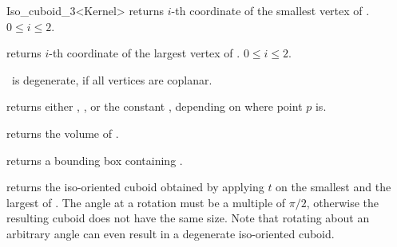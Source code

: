 \begin{ccRefClass} {Iso_cuboid_3<Kernel>}
         {returns $i$-th  coordinate of
          the smallest vertex of \ccVar. 
          \ccPrecond $0 \leq i \leq 2$.}

         {returns $i$-th  coordinate of
          the largest vertex of \ccVar. 
          \ccPrecond $0 \leq i \leq 2$.}

\ccPredicates

       {%
        \ccVar\ is degenerate, if all vertices
        are coplanar.}

       {returns either ,
        , or the constant
        , 
        depending on where point $p$ is.}

       {}
\ccGlue
{}
       {}
\ccGlue
{}
       {}


       {returns the volume of \ccVar. }

       {returns a bounding box containing \ccVar. }

       {returns the iso-oriented cuboid obtained by applying $t$ on 
        the smallest and the largest of \ccVar.
        \ccPrecond The angle at a rotation must be a multiple of $\pi/2$,
        otherwise the resulting cuboid does not have the same size.
        Note that rotating about an arbitrary angle can even result in
        a degenerate iso-oriented cuboid.}


\ccSeeAlso
{} \\

\end{ccRefClass} 
